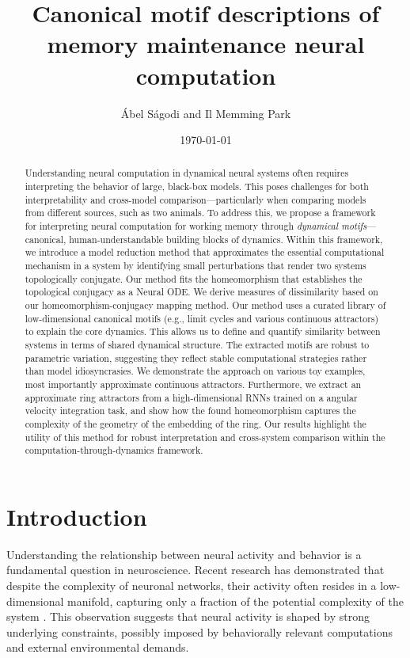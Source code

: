 \documentclass{article}
\title{Canonical motif descriptions of memory maintenance neural computation}
\author{\'Abel S\'agodi and Il Memming Park}
\date{\today}
\theoremstyle{definition} \newtheorem{definition}{Definition}  \newtheorem{example}{Example}
\theoremstyle{remark} \newtheorem{remark}{Remark}
\newcounter{ct}
\begin{document}
\maketitle


\begin{abstract}

Understanding neural computation in dynamical neural systems often requires interpreting the behavior of large, black-box models.
This poses challenges for both interpretability and cross-model comparison—particularly when comparing models from different sources, such as two animals.
To address this, we propose a framework for interpreting neural computation for working memory through \emph{dynamical motifs}—canonical, human-understandable building blocks of dynamics.
Within this framework, we introduce a model reduction method that approximates the essential computational mechanism in a system by identifying small perturbations that render two systems topologically conjugate.
Our method fits the homeomorphism that establishes the topological conjugacy as a Neural ODE.
We derive measures of dissimilarity based on our homeomorphism-conjugacy mapping method.
Our method uses a curated library of low-dimensional canonical motifs (e.g., limit cycles and various continuous attractors) to explain the core dynamics.
This allows us to define and quantify similarity between systems in terms of shared dynamical structure.
The extracted motifs are robust to parametric variation, suggesting they reflect stable computational strategies rather than model idiosyncrasies.
We demonstrate the approach on various toy examples, most importantly approximate continuous attractors.
Furthermore, we extract an approximate ring attractors from a high-dimensional RNNs trained on a angular velocity integration task, and show how the found homeomorphism captures the complexity of the geometry of the embedding of the ring.
Our results highlight the utility of this method for robust interpretation and cross-system comparison within the computation-through-dynamics framework.

\end{abstract}

\section{Introduction}\label{sec:intro}
Understanding the relationship between neural activity and behavior is a fundamental question in neuroscience.
 Recent research has demonstrated that despite the complexity of neuronal networks, their activity often resides in a low-dimensional manifold, capturing only a fraction of the potential complexity of the system \citep{duncker2021dynamics}.
 This observation suggests that neural activity is shaped by strong underlying constraints, possibly imposed by behaviorally relevant computations and external environmental demands.
\end{document}
